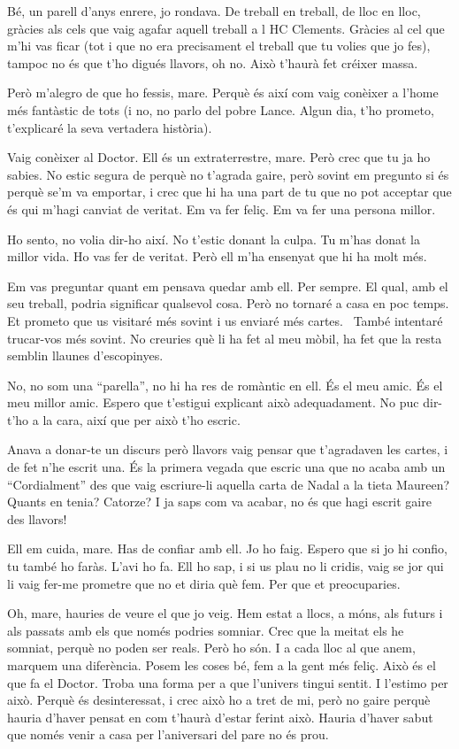 Bé, un parell d'anys enrere, jo rondava. De treball en treball, de lloc
en lloc, gràcies als cels que vaig agafar aquell treball a l HC
Clements. Gràcies al cel que m'hi vas ficar (tot i que no era
precisament el treball que tu volies que jo fes), tampoc no és que t'ho
digués llavors, oh no. Això t'haurà fet créixer massa.

Però m'alegro de que ho fessis, mare. Perquè és així com vaig conèixer a
l'home més fantàstic de tots (i no, no parlo del pobre Lance. Algun dia,
t'ho prometo, t'explicaré la seva vertadera història).

Vaig conèixer al Doctor. Ell és un extraterrestre, mare. Però crec que
tu ja ho sabies. No estic segura de perquè no t'agrada gaire, però
sovint em pregunto si és perquè se'm va emportar, i crec que hi ha una
part de tu que no pot acceptar que és qui m'hagi canviat de veritat. Em
va fer feliç. Em va fer una persona millor.

Ho sento, no volia dir-ho així. No t'estic donant la culpa. Tu m'has
donat la millor vida. Ho vas fer de veritat. Però ell m'ha ensenyat que
hi ha molt més.

Em vas preguntar quant em pensava quedar amb ell. Per sempre. El qual,
amb el seu treball, podria significar qualsevol cosa. Però no tornaré a
casa en poc temps. Et prometo que us visitaré més sovint i us enviaré
més cartes. ~També intentaré trucar-vos més sovint. No creuries què li
ha fet al meu mòbil, ha fet que la resta semblin llaunes d'escopinyes.

No, no som una ``parella'', no hi ha res de romàntic en ell. És el meu
amic. És el meu millor amic. Espero que t'estigui explicant això
adequadament. No puc dir-t'ho a la cara, així que per això t'ho escric.

Anava a donar-te un discurs però llavors vaig pensar que t'agradaven les
cartes, i de fet n'he escrit una. És la primera vegada que escric una
que no acaba amb un ``Cordialment'' des que vaig escriure-li aquella
carta de Nadal a la tieta Maureen? Quants en tenia? Catorze? I ja saps
com va acabar, no és que hagi escrit gaire des llavors!

Ell em cuida, mare. Has de confiar amb ell. Jo ho faig. Espero que si jo
hi confio, tu també ho faràs. L'avi ho fa. Ell ho sap, i si us plau no
li cridis, vaig se jor qui li vaig fer-me prometre que no et diria què
fem. Per que et preocuparies.

Oh, mare, hauries de veure el que jo veig. Hem estat a llocs, a móns,
als futurs i als passats amb els que només podries somniar. Crec que la
meitat els he somniat, perquè no poden ser reals. Però ho són. I a cada
lloc al que anem, marquem una diferència. Posem les coses bé, fem a la
gent més feliç. Això és el que fa el Doctor. Troba una forma per a que
l'univers tingui sentit. I l'estimo per això. Perquè és desinteressat, i
crec això ho a tret de mi, però no gaire perquè hauria d'haver pensat en
com t'haurà d'estar ferint això. Hauria d'haver sabut que només venir a
casa per l'aniversari del pare no és prou.


